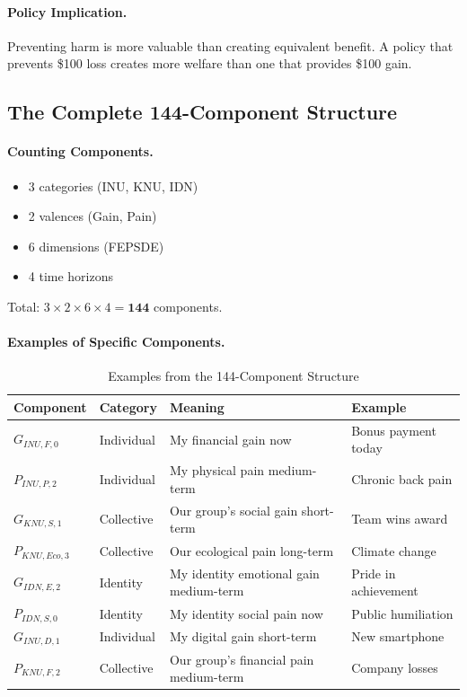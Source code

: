 \paragraph{Policy Implication.}
Preventing harm is more valuable than creating equivalent benefit.
A policy that prevents \$100 loss creates more welfare than one that provides \$100 gain.

\subsection{The Complete 144-Component Structure}

\paragraph{Counting Components.}
\begin{itemize}
  \item 3 categories (INU, KNU, IDN)
  \item 2 valences (Gain, Pain)
  \item 6 dimensions (FEPSDE)
  \item 4 time horizons
\end{itemize}

Total: $3 \times 2 \times 6 \times 4 = \mathbf{144}$ components.

\paragraph{Examples of Specific Components.}

\begin{table}[htbp]
\centering
\caption{Examples from the 144-Component Structure}
\label{tab:144-examples}
\renewcommand{\arraystretch}{1.2}
\begin{tabular}{@{}llll@{}}
\toprule
\textbf{Component} & \textbf{Category} & \textbf{Meaning} & \textbf{Example} \\
\midrule
$G_{INU,F,0}$ & Individual & My financial gain now & Bonus payment today \\
$P_{INU,P,2}$ & Individual & My physical pain medium-term & Chronic back pain \\
$G_{KNU,S,1}$ & Collective & Our group's social gain short-term & Team wins award \\
$P_{KNU,Eco,3}$ & Collective & Our ecological pain long-term & Climate change \\
$G_{IDN,E,2}$ & Identity & My identity emotional gain medium-term & Pride in achievement \\
$P_{IDN,S,0}$ & Identity & My identity social pain now & Public humiliation \\
$G_{INU,D,1}$ & Individual & My digital gain short-term & New smartphone \\
$P_{KNU,F,2}$ & Collective & Our group's financial pain medium-term & Company losses \\
\bottomrule
\end{tabular}
\end{table}

